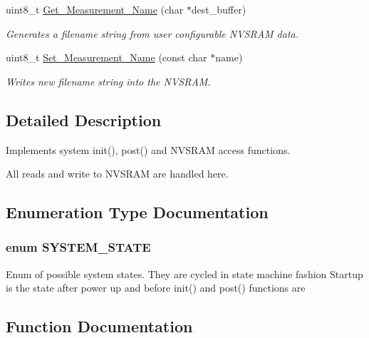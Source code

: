 \begin{DoxyCompactItemize}
uint8\+\_\+t \hyperlink{group__system_ga2569d7058f4b3f9116753afde8ad67bf}{Get\+\_\+\+Measurement\+\_\+\+Name} (char $\ast$dest\+\_\+buffer)
\begin{DoxyCompactList}\small\item\em Generates a filename string from user configurable N\+V\+S\+R\+A\+M data. \end{DoxyCompactList}\item 
uint8\+\_\+t \hyperlink{group__system_gafed20234a1df1a20f9ba724cf8d94bcb}{Set\+\_\+\+Measurement\+\_\+\+Name} (const char $\ast$name)
\begin{DoxyCompactList}\small\item\em Writes new filename string into the N\+V\+S\+R\+A\+M. \end{DoxyCompactList}\end{DoxyCompactItemize}


\subsection{Detailed Description}
Implements system init(), post() and N\+V\+S\+R\+A\+M access functions. 

All reads and write to N\+V\+S\+R\+A\+M are handled here. 

\subsection{Enumeration Type Documentation}
\hypertarget{group__system_gafeac06fb8e1e94bfba7df88a6e219d71}{}
\subsubsection[{S\+Y\+S\+T\+E\+M\+\_\+\+S\+T\+A\+T\+E}]{\setlength{\rightskip}{0pt plus 5cm}enum {\bf S\+Y\+S\+T\+E\+M\+\_\+\+S\+T\+A\+T\+E}}\label{group__system_gafeac06fb8e1e94bfba7df88a6e219d71}
Enum of possible system states. They are cycled in state machine fashion Startup is the state after power up and before init() and post() functions are 

\subsection{Function Documentation}
\hypertarget{group__system_ga2569d7058f4b3f9116753afde8ad67bf}{}
